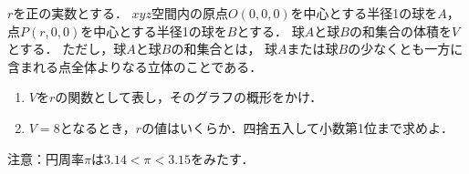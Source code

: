\documentclass[../../main.tex]{subfiles}
\begin{document}
$r$を正の実数とする．
$xyz$空間内の原点$O(0,0,0)$を中心とする半径1の球を$A$，
点$P(r,0,0)$を中心とする半径1の球を$B$とする．
球$A$と球$B$の和集合の体積を$V$とする．
ただし，球$A$と球$B$の和集合とは，
球$A$または球$B$の少なくとも一方に含まれる点全体よりなる立体のことである．
\begin{enumerate}
  \item $V$を$r$の関数として表し，そのグラフの概形をかけ．
  \item $V=8$となるとき，$r$の値はいくらか．四捨五入して小数第1位まで求めよ．
\end{enumerate}
注意：円周率$\pi$は$3.14<\pi<3.15$をみたす．
\end{document}
